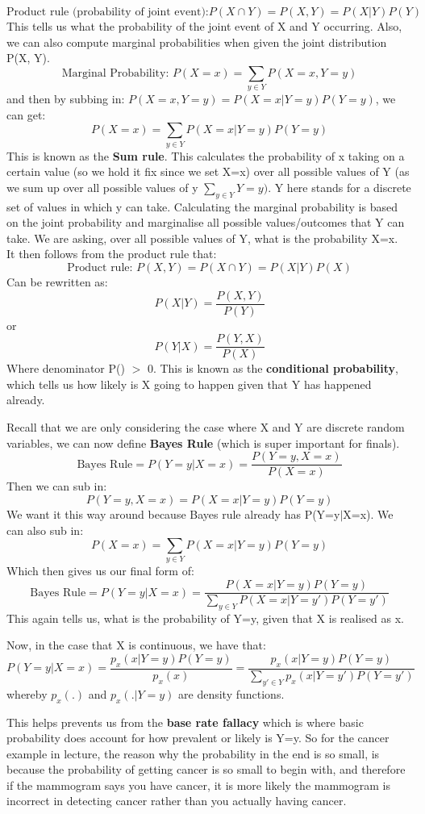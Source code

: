 \documentclass[11pt, oneside]{article}
\theoremstyle{definition}
\begin{document}
$$
\text{Product rule (probability of joint event):} P(X \cap Y) = P(X,Y) = P(X|Y)P(Y)
$$
This tells us what the probability of the joint event of X and Y occurring. Also, we can also compute marginal probabilities when given the joint distribution P(X, Y).
$$
\text{Marginal Probability: } P(X=x) = \sum\limits_{ y \in Y}P(X=x,Y=y)
$$
and then by subbing in: $P(X=x,Y=y) = P(X=x|Y=y)P(Y=y)$, we can get:
$$
P(X=x) = \sum\limits_{ y \in Y}P(X=x | Y=y)P(Y=y)
$$
This is known as the \textbf{Sum rule}. This calculates the probability of x taking on a certain value (so we hold it fix since we set X=x) over all possible values of Y (as we sum up over all possible values of y $\sum\limits_{y \in Y}Y=y)$. Y here stands for a discrete set of values in which y can take. Calculating the marginal probability is based on the joint probability and marginalise all possible values/outcomes that Y can take. We are asking, over all possible values of Y, what is the probability X=x.\\
It then follows from the product rule that:
$$
\text{Product rule: }  P(X,Y) = P(X \cap Y) = P(X|Y)P(X)
$$
Can be rewritten as:
$$
P(X|Y) = \frac{P(X,Y)}{P(Y)}
$$
or
$$
P(Y|X) = \frac{P(Y,X)}{P(X)}
$$
Where denominator P() $>$ 0. This is known as the \textbf{conditional probability}, which tells us how likely is X going to happen given that Y has happened already.

Recall that we are only considering the case where X and Y are discrete random variables, we can now define \textbf{Bayes Rule} (which is super important for finals).
$$
\text{Bayes Rule} = P(Y=y|X=x) = \frac{P(Y=y,X=x)}{P(X=x)}
$$
Then we can sub in:
$$
P(Y=y, X=x) =  P(X=x|Y=y)P(Y=y)
$$
We want it this way around because Bayes rule already has P(Y=y$|$X=x). We can also sub in:
$$
P(X=x) =\sum\limits_{ y \in Y}P(X=x | Y=y)P(Y=y)
$$
Which then gives us our final form of:
$$
\text{Bayes Rule} =  P(Y=y|X=x) = \frac{P(X=x|Y=y)P(Y=y)}{\sum\limits_{y \in Y}P(X=x|Y=y')P(Y=y')}
$$
This again tells us, what is the probability of Y=y, given that X is realised as x.

Now, in the case that X is continuous, we have that:
$$
P(Y=y|X=x) = \frac{p_x(x|Y=y)P(Y=y)}{p_x(x)} = \frac{p_x(x|Y=y)P(Y=y)}{\sum\limits_{y' \in Y}p_x(x|Y=y')P(Y=y')}
$$
whereby $p_x(.)$ and $p_x(.|Y=y)$ are density functions.

This helps prevents us from the \textbf{base rate fallacy} which is where basic probability does account for how prevalent or likely is Y=y.
So for the cancer example in lecture, the reason why the probability in the end is so small, is because the probability of getting cancer is so small to begin with, and therefore if the mammogram says you have cancer, it is more likely the mammogram is incorrect in detecting cancer rather than you actually having cancer.
\end{document}

